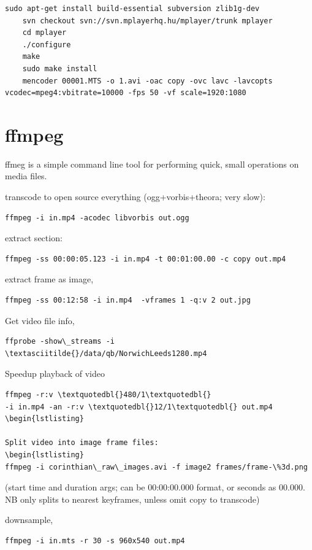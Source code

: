 \documentclass[oneside,english]{scrbook}
\begin{document}
\begin{lstlisting}
sudo apt-get install build-essential subversion zlib1g-dev
	svn checkout svn://svn.mplayerhq.hu/mplayer/trunk mplayer
	cd mplayer
	./configure
	make
	sudo make install
	mencoder 00001.MTS -o 1.avi -oac copy -ovc lavc -lavcopts vcodec=mpeg4:vbitrate=10000 -fps 50 -vf scale=1920:1080
\end{lstlisting}


\chapter{ffmpeg}

ffmeg is a simple command line tool for performing quick, small operations on media files.

transcode to open source everything (ogg+vorbis+theora; very slow):
\begin{lstlisting}
ffmpeg -i in.mp4 -acodec libvorbis out.ogg
\end{lstlisting}

extract section: 
\begin{lstlisting}
ffmpeg -ss 00:00:05.123 -i in.mp4 -t 00:01:00.00 -c copy out.mp4 
\end{lstlisting}

extract frame as image,
\begin{lstlisting}
ffmpeg -ss 00:12:58 -i in.mp4  -vframes 1 -q:v 2 out.jpg
\end{lstlisting}

Get video file info,
\begin{lstlisting}
ffprobe -show\_streams -i \textasciitilde{}/data/qb/NorwichLeeds1280.mp4
\end{lstlisting}

Speedup playback of video 
\begin{lstlisting}
ffmpeg -r:v \textquotedbl{}480/1\textquotedbl{}
-i in.mp4 -an -r:v \textquotedbl{}12/1\textquotedbl{} out.mp4
\begin{lstlisting}

Split video into image frame files: 
\begin{lstlisting}
ffmpeg -i corinthian\_raw\_images.avi -f image2 frames/frame-\%3d.png 
\end{lstlisting}
(start time and duration args; can be 00:00:00.000 format, or seconds as 00.000. NB only splits to nearest keyframes, unless omit copy to transcode)

downsample,
\begin{lstlisting}
ffmpeg -i in.mts -r 30 -s 960x540 out.mp4
\end{lstlisting}
\end{document}
